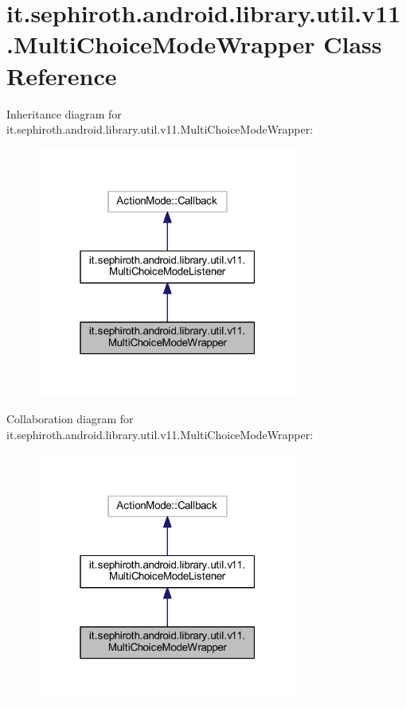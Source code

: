 \hypertarget{classit_1_1sephiroth_1_1android_1_1library_1_1util_1_1v11_1_1_multi_choice_mode_wrapper}{}\section{it.\+sephiroth.\+android.\+library.\+util.\+v11.\+Multi\+Choice\+Mode\+Wrapper Class Reference}
\label{classit_1_1sephiroth_1_1android_1_1library_1_1util_1_1v11_1_1_multi_choice_mode_wrapper}


Inheritance diagram for it.\+sephiroth.\+android.\+library.\+util.\+v11.\+Multi\+Choice\+Mode\+Wrapper\+:
\nopagebreak
\begin{figure}[H]
\begin{center}
\leavevmode
\includegraphics[width=244pt]{classit_1_1sephiroth_1_1android_1_1library_1_1util_1_1v11_1_1_multi_choice_mode_wrapper__inherit__graph}
\end{center}
\end{figure}


Collaboration diagram for it.\+sephiroth.\+android.\+library.\+util.\+v11.\+Multi\+Choice\+Mode\+Wrapper\+:
\nopagebreak
\begin{figure}[H]
\begin{center}
\leavevmode
\includegraphics[width=244pt]{classit_1_1sephiroth_1_1android_1_1library_1_1util_1_1v11_1_1_multi_choice_mode_wrapper__coll__graph}
\end{center}
\end{figure}

